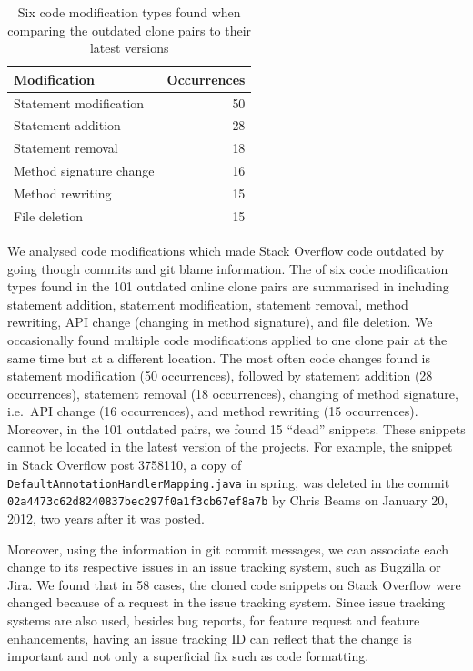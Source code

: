 \documentclass[10pt,journal,compsoc]{IEEEtran}
\begin{document}
\begin{table}
	\centering
	\caption{Six code modification types found when comparing the outdated clone pairs to their latest versions}
	\label{tab:mod_types}
		\begin{tabular}{lr}
			\toprule
			Modification & Occurrences \\
			\midrule
			Statement modification & 50 \\
			Statement addition & 28 \\
			Statement removal & 18 \\
			Method signature change & 16 \\
			Method rewriting & 15 \\
			File deletion & 15 \\
			\bottomrule 
		\end{tabular}
\end{table}

We analysed code modifications which made Stack Overflow code outdated by going
though commits and git blame information. The of six code modification
types found in the 101 outdated online clone pairs are summarised in
 including statement addition, statement modification,
statement removal, method rewriting, API change (changing in method signature),
and file deletion. We occasionally found multiple code modifications applied to
one clone pair at the same time but at a different location. The most often code
changes found is statement modification (50 occurrences), followed by statement
addition (28 occurrences), statement removal (18 occurrences), changing of
method signature, i.e.~API change (16 occurrences), and method rewriting (15
occurrences). Moreover, in the 101 outdated pairs, we found 15 ``dead''
snippets. These snippets cannot be located in the latest version of the
projects. For example, the snippet in Stack Overflow post 3758110, a copy of
{\small{\texttt{DefaultAnnotationHandlerMapping.java}}} in \textsf{spring}, was
deleted in the commit
{\small{\texttt{02a4473c62d8240837bec297f0a1f3cb67ef8a7b}}} by Chris Beams on
January 20, 2012, two years after it was posted.

Moreover, using the information in git commit messages, we can associate each
change to its respective issues in an issue tracking system, such as Bugzilla or
Jira. We found that in 58 cases, the cloned code snippets on Stack Overflow were
changed because of a request in the issue tracking system. Since issue tracking
systems are also used, besides bug reports, for feature request and feature
enhancements, having an issue tracking ID can reflect that the change is important
and not only a superficial fix such as code formatting.
\end{document}
